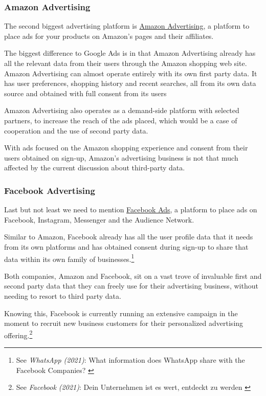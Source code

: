 \subsubsection{Amazon Advertising}

The second biggest advertising platform is \href{https://advertising.amazon.com//}{Amazon Advertising}, a platform to place ads for your products on Amazon's pages and their affiliates.

The biggest difference to Google Ads is in that Amazon Advertising already has all the relevant data from their users through the Amazon shopping web site. Amazon Advertising can almost operate entirely with its own first party data. It has user preferences, shopping history and recent searches, all from its own data source and obtained with full consent from its users

Amazon Advertising also operates as a demand-side platform with selected partners, to increase the reach of the ads placed, which would be a case of cooperation and the use of second party data.

With ads focused on the Amazon shopping experience and consent from their users obtained on sign-up, Amazon's advertising business is not that much affected by the current discussion about third-party data.

\subsubsection{Facebook Advertising}

Last but not least we need to mention \href{https://www.facebook.com/business/ads}{Facebook Ads}, a platform to place ads on Facebook, Instagram, Messenger and the Audience Network.

Similar to Amazon, Facebook already has all the user profile data that it needs from its own platforms and has obtained consent during sign-up to share that data within its own family of businesses.\footnote{See \textit{WhatsApp (2021)}: What information does WhatsApp share with the Facebook Companies? \cite{whatsApp}}

Both companies, Amazon and Facebook, sit on a vast trove of invaluable first and second party data that they can freely use for their advertising business, without needing to resort to third party data.

Knowing this, Facebook is currently running an extensive campaign in the moment to recruit new business customers for their personalized advertising offering.\footnote{See \textit{Facebook (2021)}: Dein Unternehmen ist es wert, entdeckt zu werden \cite{facebookAds}}

